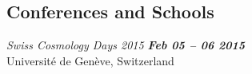 \documentclass[margin,line]{resume}
\begin{document}
\begin{resume}
\section{\mysidestyle Conferences and Schools}

\begin{list2}
  \item \emph{Swiss Cosmology Days 2015  \hfill{\bf Feb 05 -- 06 2015}} \\
      Université de Genève, Switzerland


\end{list2}




\end{resume}
\end{document}
